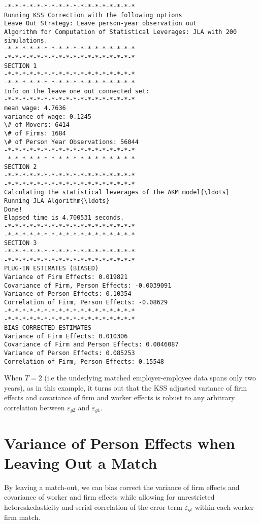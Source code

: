 \documentclass[11pt]{article}
\begin{document}
    \begin{Verbatim}[commandchars=\\\{\}]
-*-*-*-*-*-*-*-*-*-*-*-*-*-*-*-*-*-*
Running KSS Correction with the following options
Leave Out Strategy: Leave person-year observation out
Algorithm for Computation of Statistical Leverages: JLA with 200 simulations.
-*-*-*-*-*-*-*-*-*-*-*-*-*-*-*-*-*-*
-*-*-*-*-*-*-*-*-*-*-*-*-*-*-*-*-*-*
SECTION 1
-*-*-*-*-*-*-*-*-*-*-*-*-*-*-*-*-*-*
-*-*-*-*-*-*-*-*-*-*-*-*-*-*-*-*-*-*
Info on the leave one out connected set:
-*-*-*-*-*-*-*-*-*-*-*-*-*-*-*-*-*-*
mean wage: 4.7636
variance of wage: 0.1245
\# of Movers: 6414
\# of Firms: 1684
\# of Person Year Observations: 56044
-*-*-*-*-*-*-*-*-*-*-*-*-*-*-*-*-*-*
-*-*-*-*-*-*-*-*-*-*-*-*-*-*-*-*-*-*
SECTION 2
-*-*-*-*-*-*-*-*-*-*-*-*-*-*-*-*-*-*
-*-*-*-*-*-*-*-*-*-*-*-*-*-*-*-*-*-*
Calculating the statistical leverages of the AKM model{\ldots}
Running JLA Algorithm{\ldots}
Done!
Elapsed time is 4.700531 seconds.
-*-*-*-*-*-*-*-*-*-*-*-*-*-*-*-*-*-*
-*-*-*-*-*-*-*-*-*-*-*-*-*-*-*-*-*-*
SECTION 3
-*-*-*-*-*-*-*-*-*-*-*-*-*-*-*-*-*-*
-*-*-*-*-*-*-*-*-*-*-*-*-*-*-*-*-*-*
PLUG-IN ESTIMATES (BIASED)
Variance of Firm Effects: 0.019821
Covariance of Firm, Person Effects: -0.0039091
Variance of Person Effects: 0.10354
Correlation of Firm, Person Effects: -0.08629
-*-*-*-*-*-*-*-*-*-*-*-*-*-*-*-*-*-*
-*-*-*-*-*-*-*-*-*-*-*-*-*-*-*-*-*-*
BIAS CORRECTED ESTIMATES
Variance of Firm Effects: 0.010306
Covariance of Firm and Person Effects: 0.0046087
Variance of Person Effects: 0.085253
Correlation of Firm, Person Effects: 0.15548
    \end{Verbatim}

    When \(T=2\) (i.e the underlying matched employer-employee data spans
only two years), as in this example, it turns out that the KSS adjusted
variance of firm effects and covariance of firm and worker effects is
robust to any arbitrary correlation between \(\varepsilon_{g2}\) and
\(\varepsilon_{g1}\).

    \hypertarget{variance-of-person-effects-when-leaving-out-a-match}{%
\section{Variance of Person Effects when Leaving Out a
Match}\label{sec:var_pe}}

By leaving a match-out, we can bias correct the variance of firm
effects and covariance of worker and firm effects while allowing for
unrestricted hetoreskedasticity and serial correlation of the error term
\(\varepsilon_{gt}\) within each worker-firm match.
\end{document}
